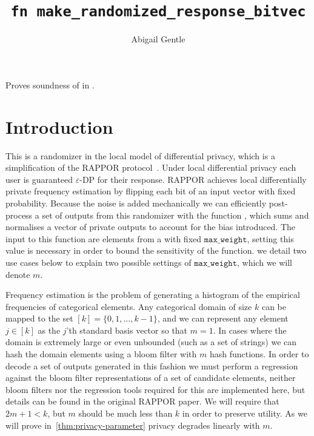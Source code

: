 \documentclass{article}
\title{\texttt{fn make\_randomized\_response\_bitvec}}
\author{Abigail Gentle}
\begin{document}
\maketitle



\contrib

Proves soundness of  in .

\section{Introduction}
This is a randomizer in the local model of differential privacy, which is a simplification of the RAPPOR protocol~\cite{rappor}. Under local differential privacy each user is guaranteed $\varepsilon$-DP for their response. RAPPOR achieves local differentially private frequency estimation by flipping each bit of an input vector with fixed probability. Because the noise is added mechanically we can efficiently post-process a set of outputs from this randomizer with the function , which sums and normalises a vector of private outputs to account for the bias introduced. The input to this function are elements from a  with fixed $\texttt{max\_weight}$, setting this value is necessary in order to bound the sensitivity of the function. we detail two use cases below to explain two possible settings of $\texttt{max\_weight}$, which we will denote $m$.

Frequency estimation is the problem of generating a histogram of the empirical frequencies of categorical elements. Any categorical domain of size $k$ can be mapped to the set $[k]=\{0,1,\ldots,k-1\}$, and we can represent any element $j\in[k]$ as the $j$'th standard basis vector so that $m=1$. In cases where the domain is extremely large or even unbounded (such as a set of strings) we can hash the domain elements using a bloom filter with $m$ hash functions. In order to decode a set of outputs generated in this fashion we must perform a regression against the bloom filter representations of a set of candidate elements, neither bloom filters nor the regression tools required for this are implemented here, but details can be found in the original RAPPOR paper. We will require that $2m+1<k$, but $m$ should be much less than $k$ in order to preserve utility. As we will prove in~\ref{thm:privacy-parameter} privacy degrades linearly with $m$.
\end{document}
